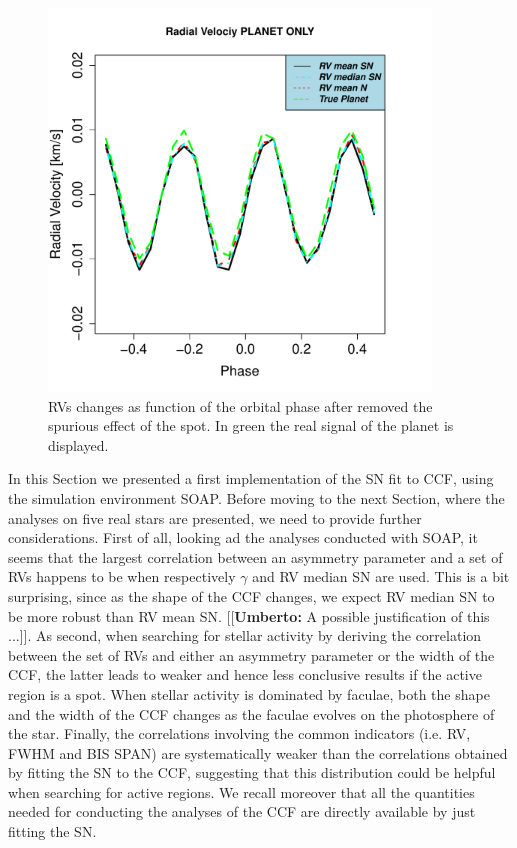 \documentclass[11pt, oneside]{article}
\newcommand{\umberto}[1]{{\color{green}[[\textbf{Umberto: }#1]]}}
\begin{document}
{\begin{figure}[htbp]
   \centering
\includegraphics[height = 4in]{RV_comparison_PLANET.pdf} 
   \caption{RVs changes as function of the orbital phase after removed the spurious effect of the spot. In green the real signal of the planet is displayed.}
    \label{fig:planet-spot}
\end{figure}

In this Section we presented a first implementation of the SN fit to CCF, using the simulation environment SOAP. Before moving to the next Section, where the analyses on five real stars are presented, we need to provide further considerations. First of all, looking ad the analyses conducted with SOAP, it seems that the largest correlation between an asymmetry parameter and a set of RVs happens to be when respectively $\gamma$ and RV median SN are used. This is a bit surprising, since as the shape of the CCF changes, we expect RV median SN to be more robust than RV mean SN. \umberto{A possible justification of this ...}. As second, when searching for stellar activity by deriving the correlation between the set of RVs and either an asymmetry parameter or the width of the CCF, the latter leads to weaker and hence less conclusive results if the active region is a spot. When stellar activity is dominated by faculae, both the shape and the width of the CCF changes as the faculae evolves on the photosphere of the star. Finally, the correlations involving the common indicators (i.e. RV, FWHM and BIS SPAN) are systematically weaker than the correlations obtained by fitting the SN to the CCF, suggesting that this distribution could be helpful when searching for active regions. We recall moreover that all the quantities needed for conducting the analyses of the CCF are directly available by just fitting the SN.

}
\end{document}
